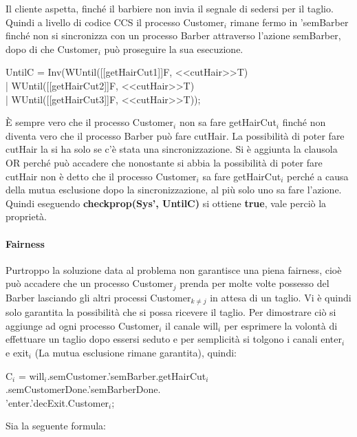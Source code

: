 Il cliente aspetta, finché il barbiere non invia il segnale di sedersi per il taglio. Quindi a livello di codice CCS il processo \textsf{Customer$_{i}$} rimane fermo in \textsf{'semBarber} finché non si sincronizza con un processo \textsf{Barber} attraverso l'azione \textsf{semBarber}, dopo di che \textsf{Customer$_{i}$} può proseguire la sua esecuzione.
\begin{center}
	\textsf{UntilC = Inv(WUntil([[getHairCut1]]F, <<cutHair>>T) \\| WUntil([[getHairCut2]]F, <<cutHair>>T) \\| WUntil([[getHairCut3]]F, <<cutHair>>T));}
\end{center}

È sempre vero che il processo \textsf{Customer$_{i}$} non sa fare \textsf{getHairCut$_{i}$} finché non diventa vero che il processo \textsf{Barber} può fare \textsf{cutHair}. La possibilità di poter fare \textsf{cutHair} la si ha solo se c'è stata una sincronizzazione. Si è aggiunta la clausola OR perché può accadere che nonostante si abbia la possibilità di poter fare \textsf{cutHair} non è detto che il processo \textsf{Customer$_{i}$} sa fare \textsf{getHairCut$_{i}$} perché a causa della mutua esclusione dopo la sincronizzazione, al più solo uno sa fare l'azione. Quindi eseguendo \textbf{checkprop(Sys', UntilC)} si ottiene \textbf{true}, vale perciò la proprietà.

\paragraph{Fairness}\mbox{}

Purtroppo la soluzione data al problema non garantisce una piena fairness, cioè può accadere che un processo \textsf{Customer$_{j}$} prenda per molte volte possesso del \textsf{Barber} lasciando gli altri processi \textsf{Customer$_{k\not=j}$} in attesa di un taglio. Vi è quindi solo garantita la possibilità che si possa ricevere il taglio.
Per dimostrare ciò si aggiunge ad ogni processo \textsf{Customer$_{i}$} il canale \textsf{will$_{i}$} per esprimere la volontà di effettuare un taglio dopo essersi seduto e per semplicità si tolgono i canali \textsf{enter$_{i}$} e \textsf{exit$_{i}$} (La mutua esclusione rimane garantita), quindi:

\textsf{C$_{i}$ = will$_{i}$.semCustomer.'semBarber.getHairCut$_{i}$.semCustomerDone.'semBarberDone.}\\
\textsf{'enter.'decExit.Customer$_{i}$;}

Sia la seguente formula:

